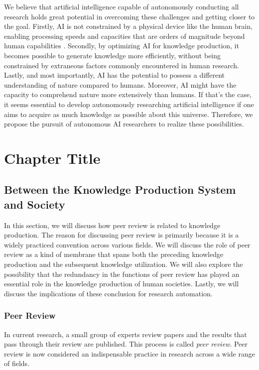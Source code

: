 \documentclass{book}
\begin{document}
We believe that artificial intelligence capable of autonomously conducting all research holds great potential in overcoming these challenges and getting closer to the goal. Firstly, AI is not constrained by a physical device like the human brain, enabling processing speeds and capacities that are orders of magnitude beyond human capabilities \cite{hope2022computational,kitano2021nobel}. Secondly, by optimizing AI for knowledge production, it becomes possible to generate knowledge more efficiently, without being constrained by extraneous factors commonly encountered in human research. Lastly, and most importantly, AI has the potential to possess a different understanding of nature compared to humans. Moreover, AI might have the capacity to comprehend nature more extensively than humans. If that's the case, it seems essential to develop autonomously researching artificial intelligence if one aims to acquire as much knowledge as possible about this universe. Therefore, we propose the pursuit of autonomous AI researchers to realize these possibilities.


\chapter{Chapter Title}

\section{Between the Knowledge Production System and Society}
In this section, we will discuss how peer review is related to knowledge production. The reason for discussing peer review is primarily because it is a widely practiced convention across various fields. We will discuss the role of peer review as a kind of membrane that spans both the preceding knowledge production and the subsequent knowledge utilization. We will also explore the possibility that the redundancy in the functions of peer review has played an essential role in the knowledge production of human societies. Lastly, we will discuss the implications of these conclusion for research automation.





\subsection{Peer Review}
In current research, a small group of experts review papers and the results that pass through their review are published. This process is called \textit{peer review}. Peer review is now considered an indispensable practice in research across a wide range of fields.
\end{document}
